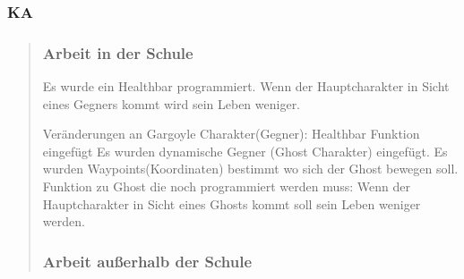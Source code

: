 
\subsubsection{KA}
\begin{quote}
	\subsubsection*{Arbeit in der Schule}
	Es wurde ein Healthbar programmiert. Wenn der Hauptcharakter in Sicht eines Gegners kommt wird sein Leben weniger.
	
	Veränderungen an Gargoyle Charakter(Gegner): Healthbar Funktion eingefügt
	Es wurden dynamische Gegner (Ghost Charakter) eingefügt.
	Es wurden Waypoints(Koordinaten) bestimmt wo sich der Ghost bewegen soll.
	Funktion zu Ghost die noch programmiert werden muss: Wenn der Hauptcharakter in Sicht eines Ghosts kommt soll sein Leben weniger werden.
	\subsubsection*{Arbeit außerhalb der Schule}
	
	
\end{quote}
